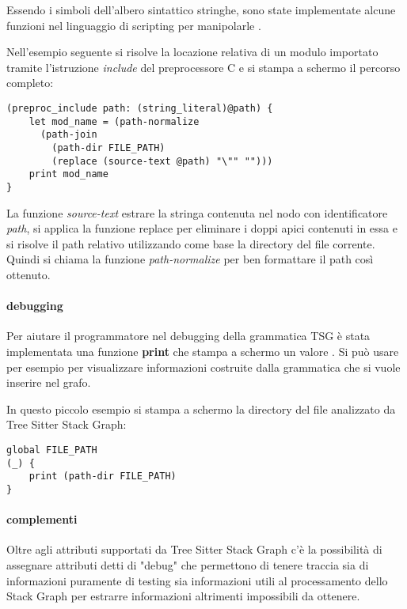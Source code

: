 Essendo i simboli dell'albero sintattico stringhe, sono state implementate alcune funzioni nel linguaggio di scripting per manipolarle \cite{TreeSitterGraphReferenceFunctions} \cite{TreeSitterStackGraphPaths}.

Nell'esempio seguente si risolve la locazione relativa di un modulo importato tramite l'istruzione \emph{include} del preprocessore C e si stampa a schermo il percorso completo:

\begin{lstlisting}
(preproc_include path: (string_literal)@path) {
    let mod_name = (path-normalize
      (path-join
        (path-dir FILE_PATH)
        (replace (source-text @path) "\"" "")))
    print mod_name
}
\end{lstlisting}

La funzione \emph{source-text} estrare la stringa contenuta nel nodo con identificatore \emph{path}, si applica la funzione replace per eliminare i doppi apici contenuti in essa e si risolve il path relativo utilizzando come base la directory del file corrente.
Quindi si chiama la funzione \emph{path-normalize} per ben formattare il path cos\`i ottenuto.

\paragraph{debugging}

Per aiutare il programmatore nel debugging della grammatica TSG \`e stata implementata una funzione \textbf{print} che stampa a schermo un valore \cite{TreeSitterGraphReferenceDebugging}.
Si pu\`o usare per esempio per visualizzare informazioni costruite dalla grammatica che si vuole inserire nel grafo.

In questo piccolo esempio si stampa a schermo la directory del file analizzato da Tree Sitter Stack Graph:

\begin{lstlisting}
global FILE_PATH
(_) {
    print (path-dir FILE_PATH)
}
\end{lstlisting}

\paragraph{complementi}

Oltre agli attributi supportati da Tree Sitter Stack Graph c'\`e la possibilit\`a di assegnare attributi detti di "debug" \cite{TreeSitterStackGraphDebugInfo} che permettono di tenere traccia sia di informazioni puramente di testing sia informazioni utili al processamento dello Stack Graph per estrarre informazioni altrimenti impossibili da ottenere.

